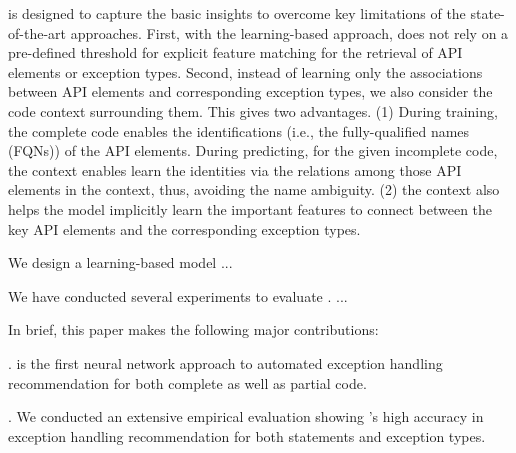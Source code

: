 
{\tool} is designed to capture the basic insights to overcome key
limitations of the state-of-the-art approaches. First, with the
learning-based approach, {\tool} does not rely on a pre-defined
threshold for explicit feature matching for the retrieval of API
elements or exception types. Second, instead of learning only the
associations between API elements and corresponding exception types,
we also consider the code context surrounding them. This gives {\tool}
two advantages. (1) During training, the complete code enables the
identifications (i.e., the fully-qualified names (FQNs)) of the API
elements. During predicting, for the given incomplete code, the
context enables {\tool} learn the identities via the relations among
those API elements in the context, thus, avoiding the name ambiguity.
(2) the context also helps the model implicitly learn the important
features to connect between the key API elements and the corresponding
exception types.

We design a learning-based model ...

We have conducted several experiments to evaluate {\tool}. ...

In brief, this paper makes the following major contributions:

. {\tool} is the first neural network approach to
  automated exception handling recommendation for both complete as
  well as partial code.

. We conducted an extensive
empirical evaluation showing {\tool}'s high accuracy in exception
handling recommendation for both statements and exception types.

  
